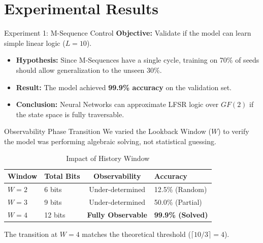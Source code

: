 \documentclass[aspectratio=169, 11pt]{beamer}
\begin{document}
\section{Experimental Results}

\begin{frame}{Experiment 1: M-Sequence Control}
    \textbf{Objective:} Validate if the model can learn simple linear logic ($L=10$).
    
    \begin{itemize}
        \item \textbf{Hypothesis:} Since M-Sequences have a single cycle, training on 70\% of seeds should allow generalization to the unseen 30\%.
        \item \textbf{Result:} The model achieved \textbf{99.9\% accuracy} on the validation set.
        \item \textbf{Conclusion:} Neural Networks can approximate LFSR logic over $GF(2)$ if the state space is fully traversable.
    \end{itemize}
\end{frame}

\begin{frame}{Observability Phase Transition}
    We varied the Lookback Window ($W$) to verify the model was performing algebraic solving, not statistical guessing.
    
    \begin{table}[]
    \centering
    \begin{tabular}{@{}llcl@{}}
    \toprule
    \textbf{Window} & \textbf{Total Bits} & \textbf{Observability} & \textbf{Accuracy} \\ \midrule
    $W=2$ & 6 bits & Under-determined & 12.5\% (Random) \\
    $W=3$ & 9 bits & Under-determined & 50.0\% (Partial) \\
    $W=4$ & 12 bits & \textbf{Fully Observable} & \textbf{99.9\% (Solved)} \\ \bottomrule
    \end{tabular}
    \caption{Impact of History Window}
    \end{table}
    
    The transition at $W=4$ matches the theoretical threshold ($\lceil 10/3 \rceil = 4$).
\end{frame}
\end{document}
